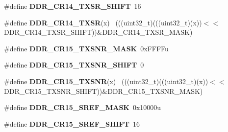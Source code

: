 \begin{DoxyCompactItemize}
\item 
\hypertarget{group___d_d_r___register___masks_ga8602fbfe82fbf8e80e426ffcb5e4d7c6}{}\#define {\bfseries D\+D\+R\+\_\+\+C\+R14\+\_\+\+T\+X\+S\+R\+\_\+\+S\+H\+I\+F\+T}~16\label{group___d_d_r___register___masks_ga8602fbfe82fbf8e80e426ffcb5e4d7c6}

\item 
\hypertarget{group___d_d_r___register___masks_gae88ad27e55bf84ee36059ad476ea2b3d}{}\#define {\bfseries D\+D\+R\+\_\+\+C\+R14\+\_\+\+T\+X\+S\+R}(x)                                              ~(((uint32\+\_\+t)(((uint32\+\_\+t)(x))$<$$<$D\+D\+R\+\_\+\+C\+R14\+\_\+\+T\+X\+S\+R\+\_\+\+S\+H\+I\+F\+T))\&D\+D\+R\+\_\+\+C\+R14\+\_\+\+T\+X\+S\+R\+\_\+\+M\+A\+S\+K)\label{group___d_d_r___register___masks_gae88ad27e55bf84ee36059ad476ea2b3d}

\item 
\hypertarget{group___d_d_r___register___masks_gadaf4ca9a632bc1ffdd2070c0593759a8}{}\#define {\bfseries D\+D\+R\+\_\+\+C\+R15\+\_\+\+T\+X\+S\+N\+R\+\_\+\+M\+A\+S\+K}~0x\+F\+F\+F\+Fu\label{group___d_d_r___register___masks_gadaf4ca9a632bc1ffdd2070c0593759a8}

\item 
\hypertarget{group___d_d_r___register___masks_ga1758dc2c083dc10cb1a42108e9445cc4}{}\#define {\bfseries D\+D\+R\+\_\+\+C\+R15\+\_\+\+T\+X\+S\+N\+R\+\_\+\+S\+H\+I\+F\+T}~0\label{group___d_d_r___register___masks_ga1758dc2c083dc10cb1a42108e9445cc4}

\item 
\hypertarget{group___d_d_r___register___masks_ga69ed18bb8d4fd29535b036b95f909851}{}\#define {\bfseries D\+D\+R\+\_\+\+C\+R15\+\_\+\+T\+X\+S\+N\+R}(x)                                            ~(((uint32\+\_\+t)(((uint32\+\_\+t)(x))$<$$<$D\+D\+R\+\_\+\+C\+R15\+\_\+\+T\+X\+S\+N\+R\+\_\+\+S\+H\+I\+F\+T))\&D\+D\+R\+\_\+\+C\+R15\+\_\+\+T\+X\+S\+N\+R\+\_\+\+M\+A\+S\+K)\label{group___d_d_r___register___masks_ga69ed18bb8d4fd29535b036b95f909851}

\item 
\hypertarget{group___d_d_r___register___masks_ga897a73e18a2152f1ba34290a97f66616}{}\#define {\bfseries D\+D\+R\+\_\+\+C\+R15\+\_\+\+S\+R\+E\+F\+\_\+\+M\+A\+S\+K}~0x10000u\label{group___d_d_r___register___masks_ga897a73e18a2152f1ba34290a97f66616}

\item 
\hypertarget{group___d_d_r___register___masks_gad53a378ee6085743af324446a46ac970}{}\#define {\bfseries D\+D\+R\+\_\+\+C\+R15\+\_\+\+S\+R\+E\+F\+\_\+\+S\+H\+I\+F\+T}~16\label{group___d_d_r___register___masks_gad53a378ee6085743af324446a46ac970}


\end{DoxyCompactItemize}
